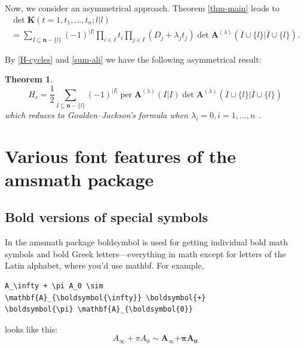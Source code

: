 \documentclass{article}
\newcommand{\ntt}{\normalfont\ttfamily}
\newcommand{\cn}[1]{{\protect\ntt\bslash#1}}
\newcommand{\pkg}[1]{{\protect\ntt#1}}
\newtheorem{thm}{Theorem}[section]
\theoremstyle{definition}
\theoremstyle{remark}
\DeclareMathOperator{\per}{per}
\newcommand{\envert}[1]{\left\lvert#1\right\rvert}
\let\abs=\envert
\begin{document}
Now, we consider an asymmetrical approach. Theorem \ref{thm-main} leads to
\begin{multline}
\det\mathbf{K}(t=1,t_1,\dots,t_n;l |l )\\
=\sum_{I\subseteq\mathbf{n}-\{l \}}
(-1)^{\abs{I}}\prod_{i\in I}t_i\prod_{j\in I}
(D_j+\lambda_jt_j)\det\mathbf{A}^{(\lambda)}
(\overline I\cup\{l \}|\overline I\cup\{l \}).
\end{multline}

By \eqref{H-cycles} and \eqref{sum-ali} we have the following asymmetrical
result:
\begin{thm}\label{thm-asym}
\begin{equation}
H_c=\frac12\sum_{I\subseteq\mathbf{n}-\{l \}}
(-1)^{\abs{I}}\per\mathbf{A}^{(\lambda)}(I|I)\det
\mathbf{A}^{(\lambda)}
(\overline I\cup\{l \}|\overline I\cup\{l \})
\end{equation}
which reduces to Goulden--Jackson's formula when $\lambda_i=0,i=1,\dots,n$
\cite{mami:matrixth}.
\end{thm}

\section{Various font features of the \pkg{amsmath} package}
\label{s:font}
\subsection{Bold versions of special symbols}

In the \pkg{amsmath} package \cn{boldsymbol} is used for getting
individual bold math symbols and bold Greek letters---everything in
math except for letters of the Latin alphabet,
where you'd use \cn{mathbf}.  For example,
\begin{verbatim}
A_\infty + \pi A_0 \sim
\mathbf{A}_{\boldsymbol{\infty}} \boldsymbol{+}
\boldsymbol{\pi} \mathbf{A}_{\boldsymbol{0}}
\end{verbatim}
looks like this:
\[A_\infty + \pi A_0 \sim \mathbf{A}_{\boldsymbol{\infty}}
\boldsymbol{+} \boldsymbol{\pi} \mathbf{A}_{\boldsymbol{0}}\]
\end{document}
